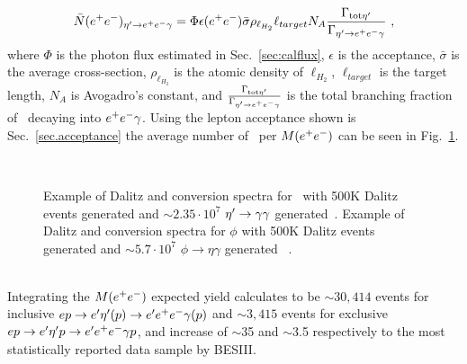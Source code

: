 \begin{align}
\bar{N}(e^+e^-)_{\eta^{\prime} \to e^+e^- \gamma} = \Phi \epsilon(e^+e^-)\bar{\sigma} \rho_{\ell_{H_2}}\ell_{target}N_A \frac{\Gamma_{\mathrm{tot} \eta^{\prime}}}{\Gamma_{\eta^{\prime} \to e^+e^- \gamma}}\ ,
\end{align}
where $\Phi$ is the photon flux estimated in Sec.~\ref{sec:calflux}, $\epsilon$ is the acceptance, $\bar{\sigma}$ is the average cross-section, $\rho_{\ell_{H_2}}$ is the atomic density of $\ell_{H_2}$, $\ell_{target}$ is the target length, $N_A$ is Avogadro's constant, and $\frac{\Gamma_{\mathrm{tot} \eta^{\prime}}}{\Gamma_{\eta^{\prime} \to e^+e^- \gamma}}$ is the total branching fraction of \etaTP \  decaying into $e^+e^- \gamma$.
Using the lepton acceptance shown is Sec.~\ref{sec.acceptance} the average number of \etaTP \  per $M(e^+e^-)$ can be seen in Fig.~\ref{fig:etayield}.
 \begin{figure}[h!]\begin{center}
\\
\caption[Dalitz and conversion spectra for \etaTP \ and $\phi$]{\label{fig:etayield}Example of Dalitz and conversion spectra for \etaTP \ with 500K Dalitz events generated and $\sim 2.35 \cdot 10^7$ $\eta^{\prime} \to \gamma \gamma$ generated~.  Example of Dalitz and conversion spectra for $\phi$  with 500K Dalitz events generated and $\sim 5.7 \cdot 10^7$ $\phi \to \eta \gamma$ generated ~. }
\end{center}\end{figure}\\
Integrating the $M(e^+e^-)$ expected yield calculates to be $\sim 30,414$ events for inclusive $ep\to e'\eta^{\prime} (p) \to e'e^+e^- \gamma(p)$ and $\sim 3,415$ events for exclusive $ep\to e'\eta^{\prime} p \to e'e^+e^- \gamma p$, and increase of $\sim$35 and $\sim$3.5 respectively to the most statistically reported data sample by BESIII. 

\FloatBarrier
